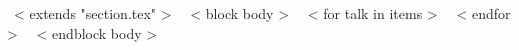 \vspace{3mm}
~< extends "section.tex" >~
~< block body >~
~< for talk in items >~
~< endfor >~
~< endblock body >~
